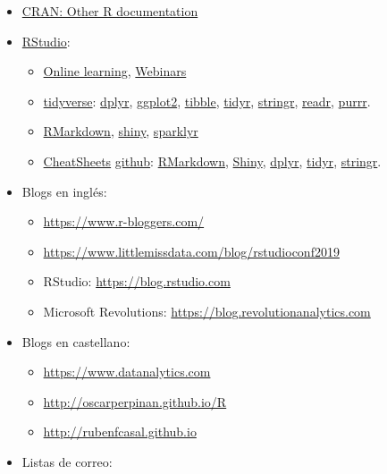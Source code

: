 \documentclass[
]{book}
\theoremstyle{break}
\theoremstyle{definition}
\theoremstyle{definition}
\theoremstyle{definition}
\theoremstyle{definition}
\theoremstyle{remark}
\begin{document}
\begin{itemize}
\item
  \href{https://www.r-project.org/other-docs.html}{CRAN: Other R documentation}
\item
  \href{https://www.rstudio.com}{RStudio}:

  \begin{itemize}
  \item
    \href{https://www.rstudio.com/online-learning}{Online learning},
    \href{https://resources.rstudio.com/webinars}{Webinars}
  \item
    \href{https://www.tidyverse.org}{tidyverse}:
    \href{https://dplyr.tidyverse.org}{dplyr},
    \href{https://ggplot2.tidyverse.org}{ggplot2},
    \href{https://tibble.tidyverse.org}{tibble},
    \href{https://tidyr.tidyverse.org}{tidyr},
    \href{https://stringr.tidyverse.org}{stringr},
    \href{https://readr.tidyverse.org}{readr},
    \href{https://purrr.tidyverse.org}{purrr}.
  \item
    \href{https://rmarkdown.rstudio.com}{RMarkdown}, \href{http://shiny.rstudio.com}{shiny}, \href{https://spark.rstudio.com}{sparklyr}
  \item
    \href{https://resources.rstudio.com/rstudio-cheatsheets}{CheatSheets} \href{https://github.com/rstudio/cheatsheets}{github}:
    \href{https://github.com/rstudio/cheatsheets/raw/master/rmarkdown-2.0.pdf}{RMarkdown},
    \href{https://github.com/rstudio/cheatsheets/raw/master/shiny.pdf}{Shiny},
    \href{https://github.com/rstudio/cheatsheets/raw/master/data-transformation.pdf}{dplyr},
    \href{https://github.com/rstudio/cheatsheets/raw/master/data-import.pdf}{tidyr},
    \href{https://github.com/rstudio/cheatsheets/raw/master/stringr-cheat-sheet.pdf}{stringr}.
  \end{itemize}
\item
  Blogs en inglés:

  \begin{itemize}
  \item
    \url{https://www.r-bloggers.com/}
  \item
    \url{https://www.littlemissdata.com/blog/rstudioconf2019}
  \item
    RStudio: \url{https://blog.rstudio.com}
  \item
    Microsoft Revolutions: \url{https://blog.revolutionanalytics.com}
  \end{itemize}
\item
  Blogs en castellano:

  \begin{itemize}
  \item
    \url{https://www.datanalytics.com}
  \item
    \url{http://oscarperpinan.github.io/R}
  \item
    \url{http://rubenfcasal.github.io}
  \end{itemize}
\item
  Listas de correo:


\end{itemize}
\end{document}
